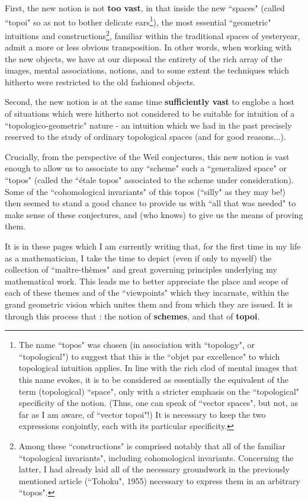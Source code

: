 First, the new notion is not \textbf{too vast}, in that inside the new ``spaces" (called ``topoi" so as not to bother delicate ears\footnote{The name ``topos" was chosen (in association with ``topology", or ``topological") to suggest that this is the ``objet par excellence" to which topological intuition applies. In line with the rich clod of mental images that this name evokes, it is to be considered as essentially the equivalent of the term (topological) ``space", only with a stricter emphasis on the ``topological" specificity of the notion. (Thus, one can speak of ``vector spaces", but not, as far as I am aware, of ``vector topoi"!) It is necessary to keep the two expressions conjointly, each with its particular specificity.}), the most essential ``geometric" intuitions and constructions\footnote{Among these ``constructions" is comprised notably that all of the familiar ``topological invariants", including cohomological invariants. Concerning the latter, I had already laid all of the necessary groundwork in the previously mentioned article (``Tohoku", 1955) necessary to express them in an arbitrary ``topos".}, familiar within the traditional spaces of yesteryear, admit a more or less obvious transposition. In other words, when working with the new objects, we have at our disposal the entirety of the rich array of the images, mental associations, notions, and to some extent the techniques which hitherto were restricted to the old fashioned objects.

Second, the new notion is at the same time \textbf{sufficiently vast} to englobe a host of situations which were hitherto not considered to be suitable for intuition of a ``topologico-geometric" nature - an intuition which we had in the past precisely reserved to the study of ordinary topological spaces (and for good reasons...). 

Crucially, from the perspective of the Weil conjectures, this new notion is vast enough to allow us to associate to any ``scheme" such a ``generalized space" or ``topos" (called the ``\'etale topos" associated to the scheme under consideration). Some of the ``cohomological invariants" of this topos (``silly" as they may be!) then seemed to stand a good chance to provide us with ``all that was needed" to make sense of these conjectures, and (who knows) to give us the means of proving them.

It is in these pages which I am currently writing that, for the first time in my life as a mathematician, I take the time to depict (even if only to myself) the collection of ``ma\^itre-th\`emes" and great governing principles underlying my mathematical work. This leads me to better appreciate the place and scope of each of these themes and of the ``viewpoints" which they incarnate, within the grand geometric vision which unites them and from which they are issued. It is through this process that    : the notion of \textbf{schemes}, and that of \textbf{topoi}.

